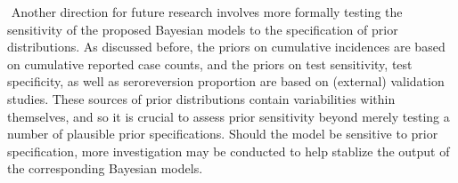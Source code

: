 \newline$ $
Another direction for future research involves more formally testing the sensitivity of the proposed Bayesian models to the specification of prior distributions. As discussed before, the priors on cumulative incidences are based on cumulative reported case counts, and the priors on test sensitivity, test specificity, as well as seroreversion proportion are based on (external) validation studies. These sources of prior distributions contain variabilities within themselves, and so it is crucial to assess prior sensitivity beyond merely testing a number of plausible prior specifications. Should the model be sensitive to prior specification, more investigation may be conducted to help stablize the output of the corresponding Bayesian models.